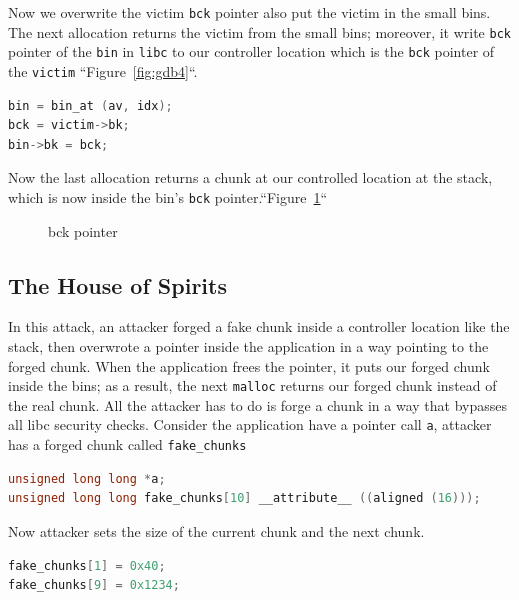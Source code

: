 \documentclass{masterthesis}
\newcommand*\sbs{small bins}
\newcommand*\mallocc{\lstinline{malloc}\xspace}
\begin{document}
Now we overwrite the victim \lstinline{bck} pointer also put the victim in the \sbs{}. The next allocation returns the victim from the \sbs{}; moreover, it write \lstinline{bck} pointer of the \lstinline{bin} in \lstinline{libc} to our controller location which is the \lstinline{bck} pointer of the \lstinline{victim} ``Figure~\ref{fig:gdb4}``.

\begin{lstlisting}[language=c,frame=tlrb]
bin = bin_at (av, idx);
bck = victim->bk;
bin->bk = bck;
\end{lstlisting}

Now the last allocation returns a chunk at our controlled location at the stack, which is now inside the bin's \lstinline{bck} pointer.``Figure~\ref{fig:gdb5}``

\begin{figure}[h!]
\caption{bck pointer}
\label{fig:gdb5}
\end{figure}

\subsection{The House of Spirits}
\label{subsect:housespirits}
In this attack, an attacker forged a fake chunk inside a controller location like the stack, then overwrote a pointer inside the application in a way pointing to the forged chunk. When the application frees the pointer, it puts our forged chunk inside the bins; as a result, the next \mallocc{} returns our forged chunk instead of the real chunk. All the attacker has to do is forge a chunk in a way that bypasses all libc security checks. Consider the application have a pointer call \lstinline{a}, attacker has a forged chunk called \lstinline{fake_chunks}

\begin{lstlisting}[language=c,frame=tlrb]
unsigned long long *a;
unsigned long long fake_chunks[10] __attribute__ ((aligned (16)));
\end{lstlisting}

Now attacker sets the size of the current chunk and the next chunk.

\begin{lstlisting}[language=c,frame=tlrb]
fake_chunks[1] = 0x40;
fake_chunks[9] = 0x1234;
\end{lstlisting}
\end{document}
